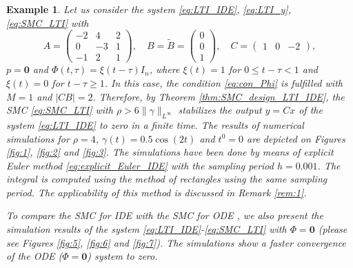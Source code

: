 \documentclass{article}
\newcommand{\zero}{\mathbf{0}}
\newtheorem{example}{Example}
\begin{document}
\begin{example}\itshape
	Let us consider the system \eqref{eq:LTI_IDE}, \eqref{eq:LTI_y}, \eqref{eq:SMC_LTI} with 
	\[
	A=\left(
	\begin{smallmatrix}
		-2 & 4 & 2\\
		0 & -3 & 1\\
		-1 & 2 & 1
	\end{smallmatrix}
	\right), \quad B=\tilde B=\left(\begin{smallmatrix}
		0\\
		0\\
		1
	\end{smallmatrix}
	\right),  \quad  C=\left(
	\begin{smallmatrix}
		1 & 0 & -2
	\end{smallmatrix}
	\right),
	\]
	$p=\zero$ and $\Phi(t,\tau)=\xi(t-\tau)I_n$, where $\xi(t)=1$ for $0\leq t-\tau< 1$ and $\xi(t)=0$ for $t-\tau \geq 1$. In this case, the condition \eqref{eq:con_Phi} is fulfilled with $M=1$ and $|CB|=2$. 
	Therefore, by Theorem \ref{thm:SMC_design_LTI_IDE},
	the SMC  \eqref{eq:SMC_LTI} with	 $ \rho>6 \|\gamma\|_{L^{\infty}}$
	stabilizes the output $y=Cx$ of the system \eqref{eq:LTI_IDE} to zero in a finite time.
	The results of numerical simulations for $\rho=4$, $\gamma(t)=0.5\cos(2t)$ and $t^0=0$ are depicted on Figures 
	\ref{fig:1}, \ref{fig:2} and \ref{fig:3}. The simulations have been done by means of explicit Euler method \eqref{eq:explicit_Euler_IDE}
	with the sampling period $h=0.001$. The integral is computed using the method of rectangles using the same sampling period.
	The applicability of this method  is discussed in Remark \ref{rem:1}.
	
	To  compare the SMC for IDE with the SMC for ODE , we also present the simulation results of the system \eqref{eq:LTI_IDE}-\eqref{eq:SMC_LTI}  with $\Phi=\zero$ (please see Figures \ref{fig:5}, \ref{fig:6} and \ref{fig:7}). The simulations show a faster convergence of the ODE ($\Phi=\zero$) system to zero. 
	

\end{example}
\end{document}

